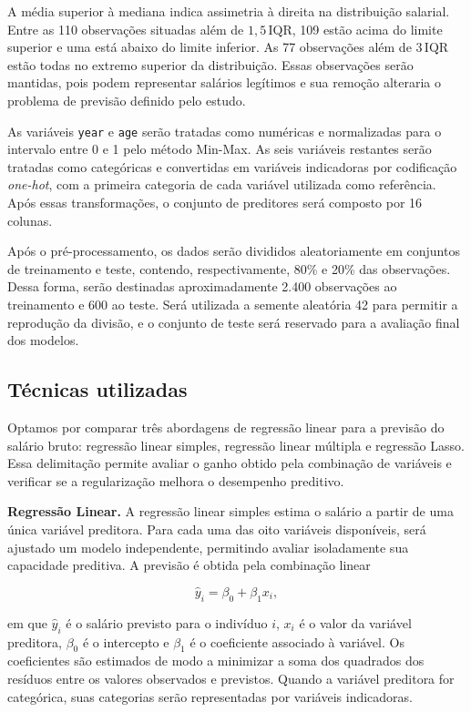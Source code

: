 A média superior à mediana indica assimetria à direita na distribuição salarial. Entre as 110 observações situadas além de $1{,}5\,\mathrm{IQR}$, 109 estão acima do limite superior e uma está abaixo do limite inferior. As 77 observações além de $3\,\mathrm{IQR}$ estão todas no extremo superior da distribuição. Essas observações serão mantidas, pois podem representar salários legítimos e sua remoção alteraria o problema de previsão definido pelo estudo.

As variáveis \texttt{year} e \texttt{age} serão tratadas como numéricas e normalizadas para o intervalo entre 0 e 1 pelo método Min-Max. As seis variáveis restantes serão tratadas como categóricas e convertidas em variáveis indicadoras por codificação \textit{one-hot}, com a primeira categoria de cada variável utilizada como referência. Após essas transformações, o conjunto de preditores será composto por 16 colunas.

Após o pré-processamento, os dados serão divididos aleatoriamente em conjuntos de treinamento e teste, contendo, respectivamente, 80\% e 20\% das observações. Dessa forma, serão destinadas aproximadamente 2.400 observações ao treinamento e 600 ao teste. Será utilizada a semente aleatória 42 para permitir a reprodução da divisão, e o conjunto de teste será reservado para a avaliação final dos modelos.

\subsection{Técnicas utilizadas}

Optamos por comparar três abordagens de regressão linear para a previsão do salário bruto: regressão linear simples, regressão linear múltipla e regressão Lasso. Essa delimitação permite avaliar o ganho obtido pela combinação de variáveis e verificar se a regularização melhora o desempenho preditivo.

\textbf{Regressão Linear.} A regressão linear simples estima o salário a partir de uma única variável preditora. Para cada uma das oito variáveis disponíveis, será ajustado um modelo independente, permitindo avaliar isoladamente sua capacidade preditiva. A previsão é obtida pela combinação linear

\begin{equation}
    \widehat{y}_i = \beta_0 + \beta_1 x_i,
\end{equation}

\noindent em que $\widehat{y}_i$ é o salário previsto para o indivíduo $i$, $x_i$ é o valor da variável preditora, $\beta_0$ é o intercepto e $\beta_1$ é o coeficiente associado à variável. Os coeficientes são estimados de modo a minimizar a soma dos quadrados dos resíduos entre os valores observados e previstos. Quando a variável preditora for categórica, suas categorias serão representadas por variáveis indicadoras.

